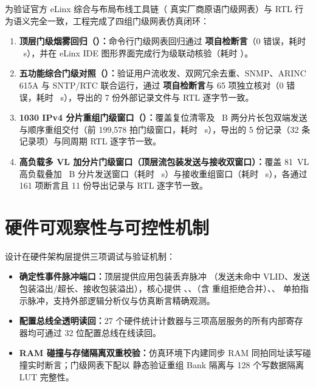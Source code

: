 为验证官方 eLinx 综合与布局布线工具链（ 真实厂商原语门级网表）与 RTL 行为语义完全一致，工程完成了四组门级网表仿真闭环：
\begin{enumerate}[leftmargin=2em,itemsep=1pt]
  \item \textbf{顶层门级烟雾回归（）：}命令行门级网表回归通过 \textbf{\ElinxChecks{} 项自检断言}（0 错误，耗时 \NetElinxTime~s），并在 eLinx IDE 图形界面完成行为级联动核验（耗时 ）。
  \item \textbf{五功能综合门级对照（）：}验证用户流收发、双网冗余去重、SNMP、ARINC 615A 与 SNTP/RTC 联合运行，通过 \textbf{\SvcChecks{} 项自检断言}与 65 项独立核对（0 错误，耗时 \NetCliTime~s），导出的 7 份外部记录文件与 RTL 逐字节一致。
  \item \textbf{1030 IPv4 分片重组门级窗口（）：}覆盖复位清零及 ~B 两分片长包双端发送与顺序重组交付（前 199,578 拍门级窗口，耗时 \NetFragTime~s），导出的 5 份记录（32 条记录项）与同周期 RTL 逐字节一致。
  \item \textbf{高负载多 VL 加分片门级窗口（顶层流包装发送与接收双窗口）：}覆盖 81~VL 高负载叠加 ~B 分片发送窗口（耗时 \NetLoadTxTime~s）与接收重组窗口（耗时 \NetLoadRxTime~s），各通过 161 项断言且 11 份导出记录与 RTL 逐字节一致。
\end{enumerate}

\section{硬件可观察性与可控性机制}\label{sec:observability}

设计在硬件架构层提供三项调试与验证机制：
\begin{itemize}[leftmargin=2em,itemsep=1pt]
  \item \textbf{确定性事件脉冲端口：}顶层提供应用包装丢弃脉冲 （发送未命中 VLID、发送包装溢出/超长、接收包装溢出），核心提供 、、（含  重组拒绝合并）、、 单拍指示脉冲，支持外部逻辑分析仪与仿真断言精确观测。
  \item \textbf{配置总线全透明读回：}27 个硬件统计计数器与三项高层服务的所有内部寄存器均可通过 32 位配置总线在线读回。
  \item \textbf{RAM 碰撞与存储隔离双重校验：}仿真环境下内建同步 RAM 同拍同址读写碰撞实时断言；门级网表下配以  静态验证重组 Bank 隔离与 128 个写数据隔离 LUT 完整性。
\end{itemize}
